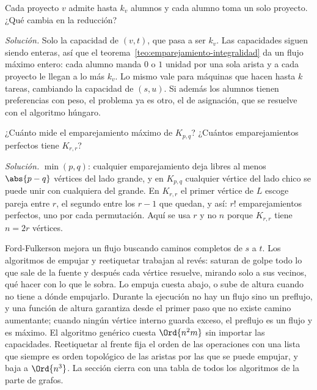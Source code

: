 \documentclass[11pt,letterpaper]{article}
\begin{document}
\begin{ejercicio}[Cupos]
  Cada proyecto $v$ admite hasta $k_v$ alumnos y cada alumno toma un
  solo proyecto. ¿Qué cambia en la reducción?

  \textit{Solución.} Solo la capacidad de $(v, t)$, que pasa a ser
  $k_v$. Las capacidades siguen siendo enteras, así que el
  teorema~\ref{teo:emparejamiento-integralidad} da un flujo máximo entero: cada
  alumno manda $0$ o $1$ unidad por una sola arista y a cada proyecto
  le llegan a lo más $k_v$. Lo mismo vale para máquinas que hacen
  hasta $k$ tareas, cambiando la capacidad de $(s, u)$. Si además los
  alumnos tienen preferencias con peso, el problema ya es otro, el de
  asignación, que se resuelve con el algoritmo húngaro.
\end{ejercicio}

\begin{ejercicio}
  ¿Cuánto mide el emparejamiento máximo de $K_{p,q}$? ¿Cuántos
  emparejamientos perfectos tiene $K_{r,r}$?

  \textit{Solución.} $\min(p, q)$: cualquier emparejamiento deja
  libres al menos $\abs{p - q}$ vértices del lado grande, y en
  $K_{p,q}$ cualquier vértice del lado chico se puede unir con
  cualquiera del grande. En $K_{r,r}$ el primer vértice de $L$ escoge
  pareja entre $r$, el segundo entre los $r - 1$ que quedan, y así:
  $r!$ emparejamientos perfectos, uno por cada permutación. Aquí se
  usa $r$ y no $n$ porque $K_{r,r}$ tiene $n = 2r$ vértices.
\end{ejercicio}

\newpage


\label{sec:push-relabel}

\begin{quick_sum}
  Ford-Fulkerson mejora un flujo buscando caminos completos de $s$ a
  $t$. Los algoritmos de empujar y reetiquetar trabajan al revés:
  saturan de golpe todo lo que sale de la fuente y después cada
  vértice resuelve, mirando solo a sus vecinos, qué hacer con lo que le
  sobra. Lo empuja cuesta abajo, o sube de altura cuando no tiene a
  dónde empujarlo. Durante la ejecución no hay un flujo sino un
  preflujo, y una función de altura garantiza desde el primer paso que
  no existe camino aumentante; cuando ningún vértice interno guarda
  exceso, el preflujo es un flujo y es máximo. El algoritmo genérico
  cuesta $\Ord{n^2 m}$ sin importar las capacidades. Reetiquetar al
  frente fija el orden de las operaciones con una lista que siempre es
  orden topológico de las aristas por las que se puede empujar, y baja
  a $\Ord{n^3}$. La sección cierra con una tabla de todos los
  algoritmos de la parte de grafos.
\end{quick_sum}
\end{document}
